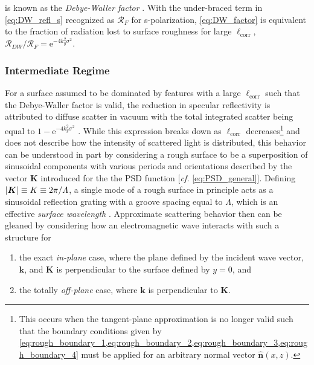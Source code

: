 is known as the \emph{Debye-Waller factor} \cite{Gibaud2009}. 
With the under-braced term in \cref{eq:DW_refl_s} recognized as $\mathcal{R}_F$ for s-polarization, \cref{eq:DW_factor} is equivalent to the fraction of radiation lost to surface roughness for large $\ell_{\text{corr}}$, $\mathcal{R}_{DW} / \mathcal{R}_F = \mathrm{e}^{-4 k_y^2 \sigma^2}$. 

\subsubsection{Intermediate Regime}\label{sec:intermediate_rough}
For a surface assumed to be dominated by features with a large $\ell_{\text{corr}}$ such that the Debye-Waller factor is valid, the reduction in specular reflectivity is attributed to diffuse scatter in vacuum with the total integrated scatter being equal to $1 - \mathrm{e}^{-4 k_y^2 \sigma^2}$ \cite{Wen15}. 
While this expression breaks down as $\ell_{\text{corr}}$ decreases\footnote{This occurs when the tangent-plane approximation is no longer valid such that the boundary conditions given by \cref{eq:rough_boundary_1,eq:rough_boundary_2,eq:rough_boundary_3,eq:rough_boundary_4} must be applied for an arbitrary normal vector $\mathbold{\hat{n}} (x,z)$.} and does not describe how the intensity of scattered light is distributed, this behavior can be understood in part by considering a rough surface to be a superposition of sinusoidal components with various periods and orientations described by the vector $\mathbold{K}$ introduced for the the PSD function [\emph{cf.\@} \cref{eq:PSD_general}]. 
Defining $\abs{\mathbold{K}} \equiv K \equiv 2 \pi / \Lambda$, a single mode of a rough surface in principle acts as a sinusoidal reflection grating with a groove spacing equal to $\Lambda$, which is an effective \emph{surface wavelength} \cite{Cash87,Sentenac2009,Aschenbach85}. 
Approximate scattering behavior then can be gleaned by considering how an electromagnetic wave interacts with such a structure for 
\begin{enumerate}[noitemsep]
  \item the exact \emph{in-plane} case, where the plane defined by the incident wave vector, $\mathbold{k}$, and $\mathbold{K}$ is perpendicular to the surface defined by $y=0$, and 
  \item the totally \emph{off-plane} case, where $\mathbold{k}$ is perpendicular to $\mathbold{K}$.
 \end{enumerate}

